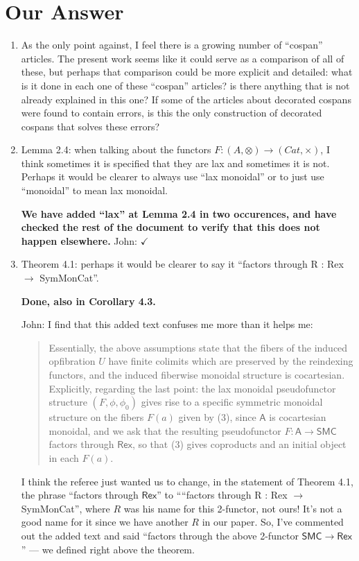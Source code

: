 \documentclass[reqno]{amsart}
\def\john{\color{red} John: }
\begin{document}
\section{Our Answer}


\begin{enumerate}

\item As the only point against, I feel there is a growing number of “cospan” articles. The present work seems like it could serve as a comparison of 
all of 
these, but perhaps that comparison could be more explicit and detailed: what is it done in each one of these “cospan” articles? is there anything 
that 
is not already explained in this one? If some of the articles about decorated cospans were found to contain errors, is this the only construction of 
decorated cospans that solves these errors?

 \item Lemma 2.4: when talking about the functors $F : (A,\otimes)\to(Cat,\times)$, I think sometimes it is specified that they are lax and sometimes 
it is not. Perhaps it would be clearer to always use “lax monoidal” or to just use “monoidal” to mean lax monoidal.

{\bf We have added ``lax'' at Lemma 2.4 in two occurences, and have checked the rest of the document to verify that this does not happen 
elsewhere.}  {\john $\checkmark$}

\item Theorem 4.1: perhaps it would be clearer to say it “factors through R : Rex $\to$ SymMonCat”.

{\bf Done, also in Corollary 4.3.}  

{\john  I find that this added text confuses me more than it helps me:
\begin{quote}
Essentially, the above assumptions state that the fibers of the induced opfibration $U$ have finite colimits which are preserved by the reindexing functors, and the induced fiberwise monoidal structure is cocartesian. Explicitly, regarding the last point: the lax monoidal pseudofunctor structure $(F,\phi,\phi_0)$ gives rise to a specific symmetric monoidal structure on the fibers $F(a)$ given by (3), since $\mathsf{A}$ is cocartesian monoidal, and we ask that the resulting pseudofunctor $F\colon \mathsf{A} \to \mathsf{SMC}$ factors through $\mathsf{Rex}$, so that (3) gives coproducts and an initial object in each $F(a)$.
\end{quote}
I think the referee just wanted us to change, in the statement of Theorem 4.1, the phrase
``factors through $\mathsf{Rex}$'' to ``“factors through R : Rex $\to$ SymMonCat”, where $R$ was his name for this 2-functor, not ours!   It's not a good name for it since we have another $R$ in our
paper.   So, I've commented out the added text and said ``factors through the above 2-functor $\mathsf{SMC} \to \mathsf{Rex}$'' --- we defined right above the theorem.}



\end{enumerate}
\end{document}
